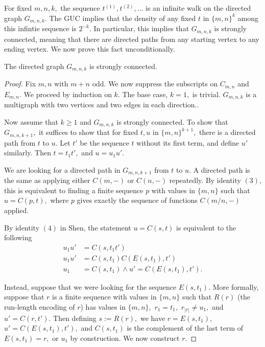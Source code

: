 \documentclass[11pt]{amsart} %
\begin{document}
For fixed $m, n, k,$ the sequence $t^{(1)}, t^{(2)}, \ldots $ is an infinite walk on the directed graph $G_{m, n, k}.$ The GUC implies that the density of any fixed $t$ in $\{m, n\}^k$ among this infintie sequence is $2^{-k}.$ In particular, this implies that $G_{m, n, k}$ is strongly connected, meaning that there are directed paths from any starting vertex to any ending vertex. We now prove this fact unconditionally.

\begin{theorem} \label{connected} The directed graph $G_{m, n, k}$ is strongly connected. \end{theorem}
\begin{proof}
Fix $m,n$ with $m+n$ odd. We now suppress the subscripts on $C_{m, n}$ and $E_{m, n}.$ We proceed by induction on $k.$ The base case, $k = 1,$ is trivial. $G_{m, n, k}$ is a multigraph with two vertices and two edges in each direction..

Now assume that $k \ge 1$ and $G_{m, n, k}$ is strongly connected. To show that $G_{m, n, k+1},$ it suffices to show that for fixed $t, u$ in $\{m, n\}^{k+1},$ there is a directed path from $t$ to $u.$ Let $t'$ be the sequence $t$ without its first term, and define $u'$ similarly. Then $t = t_1 t',$ and $u = u_1 u'.$

We are looking for a directed path in $G_{m, n, k+1}$ from $t$ to $u.$ A directed path is the same as applying either $C(m, -)$ or $C(n, -)$ repeatedly. By identity $(3)$, this is equivalent to finding a finite sequence $p$ with values in $\{m, n\}$ such that $u = C(p, t),$ where $p$ gives exactly the sequence of functions $C(m/n, -)$ applied.

By identity $(4)$ in Shen\cite{Shen}, the statement $u = C(s, t)$ is equivalent to the following
\begin{align*} u_1 u' &= C(s, t_1 t') \\ u_1 u'&= C(s, t_1) C(E(s, t_1), t') \\ u_1 &= C(s, t_1) \wedge u' = C(E(s, t_1), t'). \end{align*}

Instead, suppose that we were looking for the sequence $E(s, t_1).$ More formally, suppose that $r$ is a finite sequence with values in $\{m, n\}$ such that $R(r)$ (the run-length encoding of $r$) has values in $\{m, n\},$ $r_1 = t_1,$ $r_{|r|} \neq u_1,$ and $u' = C(r, t')$. Then defining $s:= R(r),$ we have $r = E(s, t_1),$ $u' = C(E(s, t_1), t'),$ and $C(s, t_1)$ is the complement of the last term of $E(s, t_1) = r,$ or $u_1$ by construction. We now construct $r.$


\end{proof}
\end{document}
